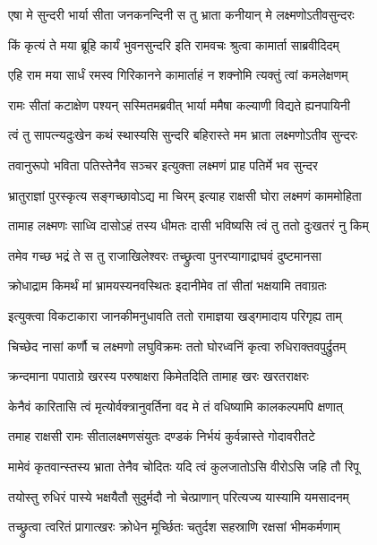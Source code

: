 \twolineshloka
{एषा मे सुन्दरी भार्या सीता जनकनन्दिनी}
{स तु भ्राता कनीयान् मे लक्ष्मणोऽतीवसुन्दरः} %

\twolineshloka
{किं कृत्यं ते मया ब्रूहि कार्यं भुवनसुन्दरि}
{इति रामवचः श्रुत्वा कामार्ता साब्रवीदिदम्} %

\twolineshloka
{एहि राम मया सार्धं रमस्व गिरिकानने}
{कामार्ताहं न शक्नोमि त्यक्तुं त्वां कमलेक्षणम्} %

\twolineshloka
{रामः सीतां कटाक्षेण पश्यन् सस्मितमब्रवीत्}
{भार्या ममैषा कल्याणी विद्यते ह्यनपायिनी} %

\twolineshloka
{त्वं तु सापत्न्यदुःखेन कथं स्थास्यसि सुन्दरि}
{बहिरास्ते मम भ्राता लक्ष्मणोऽतीव सुन्दरः} %

\twolineshloka
{तवानुरूपो भविता पतिस्तेनैव सञ्चर}
{इत्युक्ता लक्ष्मणं प्राह पतिर्मे भव सुन्दर} %

\twolineshloka
{भ्रातुराज्ञां पुरस्कृत्य सङ्गच्छावोऽद्य मा चिरम्}
{इत्याह राक्षसी घोरा लक्ष्मणं काममोहिता} %

\twolineshloka
{तामाह लक्ष्मणः साध्वि दासोऽहं तस्य धीमतः}
{दासी भविष्यसि त्वं तु ततो दुःखतरं नु किम्} %

\twolineshloka
{तमेव गच्छ भद्रं ते स तु राजाखिलेश्वरः}
{तच्छ्रुत्वा पुनरप्यागाद्राघवं दुष्टमानसा} %

\twolineshloka
{क्रोधाद्राम किमर्थं मां भ्रामयस्यनवस्थितः}
{इदानीमेव तां सीतां भक्षयामि तवाग्रतः} %

\twolineshloka
{इत्युक्त्वा विकटाकारा जानकीमनुधावति}
{ततो रामाज्ञया खड्गमादाय परिगृह्य ताम्} %

\twolineshloka
{चिच्छेद नासां कर्णौ च लक्ष्मणो लघुविक्रमः}
{ततो घोरध्वनिं कृत्वा रुधिराक्तवपुर्द्रुतम्} %

\twolineshloka
{क्रन्दमाना पपाताग्रे खरस्य परुषाक्षरा}
{किमेतदिति तामाह खरः खरतराक्षरः} %

\twolineshloka
{केनैवं कारितासि त्वं मृत्योर्वक्त्रानुवर्तिना}
{वद मे तं वधिष्यामि कालकल्पमपि क्षणात्} %

\twolineshloka
{तमाह राक्षसी रामः सीतालक्ष्मणसंयुतः}
{दण्डकं निर्भयं कुर्वन्नास्ते गोदावरीतटे} %

\twolineshloka
{मामेवं कृतवान्स्तस्य भ्राता तेनैव चोदितः}
{यदि त्वं कुलजातोऽसि वीरोऽसि जहि तौ रिपू} %

\twolineshloka
{तयोस्तु रुधिरं पास्ये भक्षयैतौ सुदुर्मदौ}
{नो चेत्प्राणान् परित्यज्य यास्यामि यमसादनम्} %

\twolineshloka
{तच्छ्रुत्वा त्वरितं प्रागात्खरः क्रोधेन मूर्च्छितः}
{चतुर्दश सहस्राणि रक्षसां भीमकर्मणाम्} %

